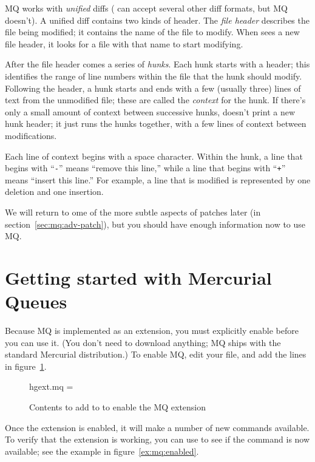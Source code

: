 MQ works with \emph{unified} diffs ( can accept several
other diff formats, but MQ doesn't).  A unified diff contains two
kinds of header.  The \emph{file header} describes the file being
modified; it contains the name of the file to modify.  When
 sees a new file header, it looks for a file with that
name to start modifying.

After the file header comes a series of \emph{hunks}.  Each hunk
starts with a header; this identifies the range of line numbers within
the file that the hunk should modify.  Following the header, a hunk
starts and ends with a few (usually three) lines of text from the
unmodified file; these are called the \emph{context} for the hunk.  If
there's only a small amount of context between successive hunks,
 doesn't print a new hunk header; it just runs the hunks
together, with a few lines of context between modifications.

Each line of context begins with a space character.  Within the hunk,
a line that begins with ``\texttt{-}'' means ``remove this line,''
while a line that begins with ``\texttt{+}'' means ``insert this
line.''  For example, a line that is modified is represented by one
deletion and one insertion.

We will return to ome of the more subtle aspects of patches later (in
section~\ref{sec:mq:adv-patch}), but you should have enough information
now to use MQ.

\section{Getting started with Mercurial Queues}
\label{sec:mq:start}

Because MQ is implemented as an extension, you must explicitly enable
before you can use it.  (You don't need to download anything; MQ ships
with the standard Mercurial distribution.)  To enable MQ, edit your
 file, and add the lines in figure~\ref{ex:mq:config}.

\begin{figure}[ht]
  \begin{codesample4}
    [extensions]
    hgext.mq =
  \end{codesample4}
  \label{ex:mq:config}
  \caption{Contents to add to  to enable the MQ extension}
\end{figure}

Once the extension is enabled, it will make a number of new commands
available.  To verify that the extension is working, you can use
 to see if the  command is now available; see
the example in figure~\ref{ex:mq:enabled}.


